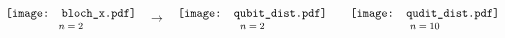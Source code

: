 \documentclass[preview,varwidth]{standalone}
\begin{document}
$
\vcenter{\hbox{
    \stackunder{\texttt{[image: bloch\_x.pdf]}}
    {\footnotesize $n=2$}
  }}
~~
\to
~~
\vcenter{\hbox{
    \stackunder{\texttt{[image: qubit\_dist.pdf]}}
    {\footnotesize $n=2$}
  }}
~~~~
\vcenter{\hbox{
    \stackunder{\texttt{[image: qudit\_dist.pdf]}}
    {\footnotesize $n=10$}
  }}
$
\end{document}
